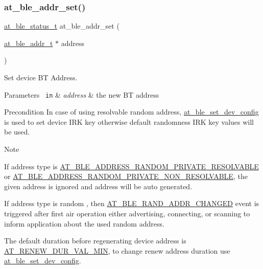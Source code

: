 \subsubsection{\texorpdfstring{at\_ble\_addr\_set()}{at\_ble\_addr\_set()}}
{\footnotesize\ttfamily \mbox{\hyperlink{group__error__codes__group_ga3b1db9b95feb157b3c188ca27fe76988}{at\+\_\+ble\+\_\+status\+\_\+t}} at\+\_\+ble\+\_\+addr\+\_\+set (\begin{DoxyParamCaption}\item[{\mbox{\hyperlink{structat__ble__addr__t}{at\+\_\+ble\+\_\+addr\+\_\+t}} $\ast$}]{address }\end{DoxyParamCaption})}



Set device BT Address. 


\begin{DoxyParams}[1]{Parameters}
\mbox{\texttt{ in}}  & {\em address} & the new BT address\\
\hline
\end{DoxyParams}
\begin{DoxyPrecond}{Precondition}
In case of using resolvable random address, \mbox{\hyperlink{group__gap__dev__config__group_ga6d329f50553f677f15cb89a823be9dc1}{at\+\_\+ble\+\_\+set\+\_\+dev\+\_\+config}} is used to set device I\+RK key otherwise default randomness I\+RK key values will be used.
\end{DoxyPrecond}
\begin{DoxyNote}{Note}

\begin{DoxyItemize}
\item If address type is \mbox{\hyperlink{at__ble__api_8h_aab076e537bd99ea1be0fbf95a2d16be4a971384228c4141e2ea44ef62666b36a4}{A\+T\+\_\+\+B\+L\+E\+\_\+\+A\+D\+D\+R\+E\+S\+S\+\_\+\+R\+A\+N\+D\+O\+M\+\_\+\+P\+R\+I\+V\+A\+T\+E\+\_\+\+R\+E\+S\+O\+L\+V\+A\+B\+LE}} or \mbox{\hyperlink{at__ble__api_8h_aab076e537bd99ea1be0fbf95a2d16be4a200d7bc6ab4567902a93ec426c5e177a}{A\+T\+\_\+\+B\+L\+E\+\_\+\+A\+D\+D\+R\+E\+S\+S\+\_\+\+R\+A\+N\+D\+O\+M\+\_\+\+P\+R\+I\+V\+A\+T\+E\+\_\+\+N\+O\+N\+\_\+\+R\+E\+S\+O\+L\+V\+A\+B\+LE}}, the given address is ignored and address will be auto generated.
\item If address type is random , then \mbox{\hyperlink{at__ble__api_8h_a3324640b95f33169515f89738ed5baebaf3fc7c0a6e3bbc9852c59a9ecaed1749}{A\+T\+\_\+\+B\+L\+E\+\_\+\+R\+A\+N\+D\+\_\+\+A\+D\+D\+R\+\_\+\+C\+H\+A\+N\+G\+ED}} event is triggered after first air operation either advertising, connecting, or scanning to inform application about the used random address.
\item The default duration before regenerating device address is \mbox{\hyperlink{at__ble__api_8h_a50b36406164b418c4de24014c3bf2a7d}{A\+T\+\_\+\+R\+E\+N\+E\+W\+\_\+\+D\+U\+R\+\_\+\+V\+A\+L\+\_\+\+M\+IN}}, to change renew address duration use \mbox{\hyperlink{group__gap__dev__config__group_ga6d329f50553f677f15cb89a823be9dc1}{at\+\_\+ble\+\_\+set\+\_\+dev\+\_\+config}}.
\end{DoxyItemize}
\end{DoxyNote}
